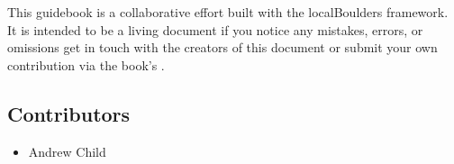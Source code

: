 \begin{multicols}{2}
This guidebook is a collaborative effort built with the localBoulders framework. It is intended to be a living document if you notice any mistakes, errors, or omissions get in touch with the creators of this document or submit your own contribution via the book's .
\subsection*{Contributors}
\begin{itemize}
\item Andrew Child
\end{itemize}
\end{multicols}
\clearpage